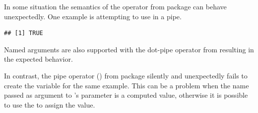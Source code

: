 \documentclass[krantz2]{krantz}\usepackage{knitr}
\begin{document}
\begin{warningbox}
In some situation the semantics of the operator \Roperator{\%>\%} from package  can behave unexpectedly. One example is attempting to use  in a pipe.

\begin{knitrout}\footnotesize
{}\color{fgcolor}\begin{kframe}
\begin{alltt}
 \hlstd{(} \hlstd{=} \hlstd{,}  \hlstd{= _)}
\end{alltt}
\begin{verbatim}
## [1] TRUE
\end{verbatim}
\end{kframe}
\end{knitrout}

Named arguments are also supported with the dot-pipe operator from  resulting in the expected behavior.

\begin{knitrout}\footnotesize
{}\color{fgcolor}
\end{knitrout}

In contrast, the pipe operator (\Roperator{\%>\%}) from package  silently and unexpectedly fails to create the variable for the same example. This can be a problem when the name passed as argument to 's parameter  is a computed value, otherwise it is possible to use the \Roperator{->} to assign the value.

\begin{knitrout}\footnotesize
{}\color{fgcolor}
\end{knitrout}
\end{warningbox}
\end{document}
